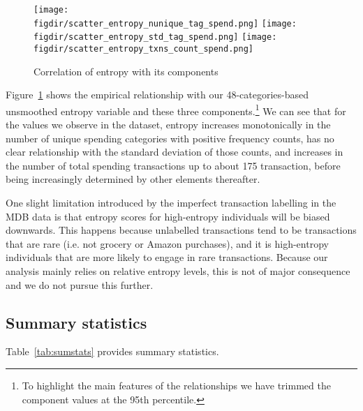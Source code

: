 \begin{figure}[h]
    \centering 
    \caption{Correlation of entropy with its components}
    \label{fig:entropy_components}
    \texttt{[image: \\figdir/scatter\_entropy\_nunique\_tag\_spend.png]}
    \texttt{[image: \\figdir/scatter\_entropy\_std\_tag\_spend.png]}
    \texttt{[image: \\figdir/scatter\_entropy\_txns\_count\_spend.png]}
\end{figure}

Figure~\ref{fig:entropy_components} shows the empirical relationship with our
48-categories-based unsmoothed entropy variable and these three
components.\footnote{To highlight the main features of the relationships we
have trimmed the component values at the 95th percentile.} We can see that for
the values we observe in the dataset, entropy increases monotonically in the
number of unique spending categories with positive frequency counts, has no
clear relationship with the standard deviation of those counts, and increases
in the number of total spending transactions up to about 175 transaction,
before being increasingly determined by other elements thereafter.

One slight limitation introduced by the imperfect transaction labelling in the
MDB data is that entropy scores for high-entropy individuals will be biased
downwards. This happens because unlabelled transactions tend to be transactions
that are rare (i.e. not grocery or Amazon purchases), and it is high-entropy
individuals that are more likely to engage in rare transactions. Because our
analysis mainly relies on relative entropy levels, this is not of major
consequence and we do not pursue this further.


\subsection{Summary statistics}%
\label{par:summary_statistics}

Table~\ref{tab:sumstats} provides summary statistics.


